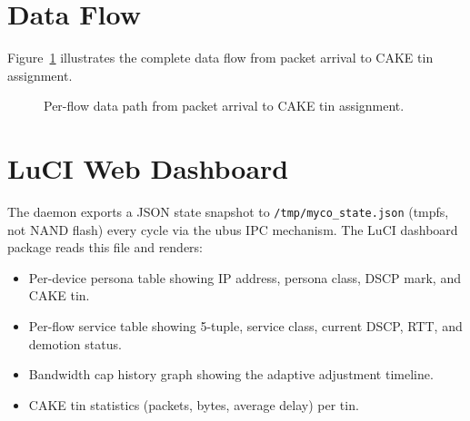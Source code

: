 \section{Data Flow}

Figure~\ref{fig:dataflow} illustrates the complete data flow from packet arrival to CAKE tin assignment.

\begin{figure}[h]
\centering
{}
\caption{Per-flow data path from packet arrival to CAKE tin assignment.}
\label{fig:dataflow}
\end{figure}

\section{LuCI Web Dashboard}

The daemon exports a JSON state snapshot to \texttt{/tmp/myco\_state.json} (tmpfs, not NAND flash) every cycle via the ubus IPC mechanism. The LuCI dashboard package reads this file and renders:

\begin{itemize}
  \item Per-device persona table showing IP address, persona class, DSCP mark, and CAKE tin.
  \item Per-flow service table showing 5-tuple, service class, current DSCP, RTT, and demotion status.
  \item Bandwidth cap history graph showing the adaptive adjustment timeline.
  \item CAKE tin statistics (packets, bytes, average delay) per tin.
\end{itemize}

